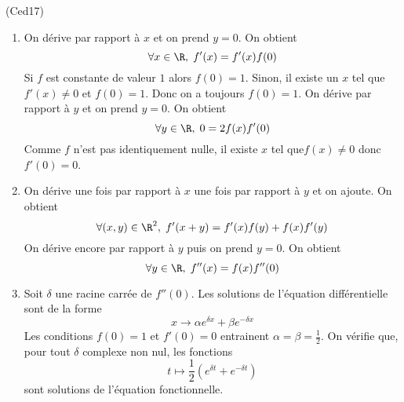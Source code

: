 \begin{tiny}(Ced17)\end{tiny}
\begin{enumerate}
  \item On dérive par rapport à $x$ et on prend $y=0$. On obtient
\begin{displaymath}
 \forall x\in \R,\; f'(x) = f'(x)f(0)
\end{displaymath}
Si $f$ est constante de valeur $1$ alors $f(0)=1$. Sinon, il existe un $x$ tel que $f'(x)\neq0$ et $f(0)=1$. Donc on a toujours $f(0)=1$.\newline
On dérive par rapport à $y$ et on prend $y=0$. On obtient
\begin{displaymath}
\forall y \in \R,\;  0 = 2f(x)f'(0) 
\end{displaymath}
Comme $f$ n'est pas identiquement nulle, il existe $x$ tel que$f(x)\neq0$ donc $f'(0)=0$.
\item On dérive une fois par rapport à $x$ une fois par rapport à $y$ et on ajoute. On obtient
\begin{displaymath}
\forall (x,y)\in \R^2,\;
f'(x+y) = f'(x)f(y) + f(x)f'(y)
\end{displaymath}
On dérive encore par rapport à $y$ puis on prend $y=0$. On obtient
\begin{displaymath}
  \forall y \in \R,\; f''(x) = f(x)f''(0)
\end{displaymath}
\item Soit $\delta$ une racine carrée de $f''(0)$. Les solutions de l'équation différentielle sont de la forme
\begin{displaymath}
  x\rightarrow \alpha e^{\delta x} + \beta e^{-\delta x}
\end{displaymath}
Les conditions $f(0)=1$ et $f'(0)=0$ entrainent $\alpha = \beta = \frac{1}{2}$.\newline
On vérifie que, pour tout $\delta$ complexe non nul, les fonctions
\begin{displaymath}
  t \mapsto \frac{1}{2}\left( e^{\delta t} + e^{-\delta t}\right) 
\end{displaymath}
sont solutions de l'équation fonctionnelle.
\end{enumerate}
